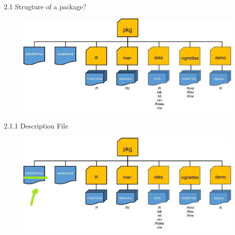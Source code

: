 \documentclass[11pt,a4paper]{beamer}
\begin{document}
\begin{frame}[t]{2.1 Strugture of a package?}
	
	
	\begin{figure}
		\centering
		\includegraphics[width=0.9\linewidth]{stott}
		\label{fig:packages}
	\end{figure}
	
	
\end{frame}









\begin{frame}[t]{2.1.1 Description File}
	
	
	\begin{figure}
		\centering
		\includegraphics[width=0.9\linewidth]{Desc}
		\label{fig:packages}
	\end{figure}
	
	
\end{frame}
\end{document}

